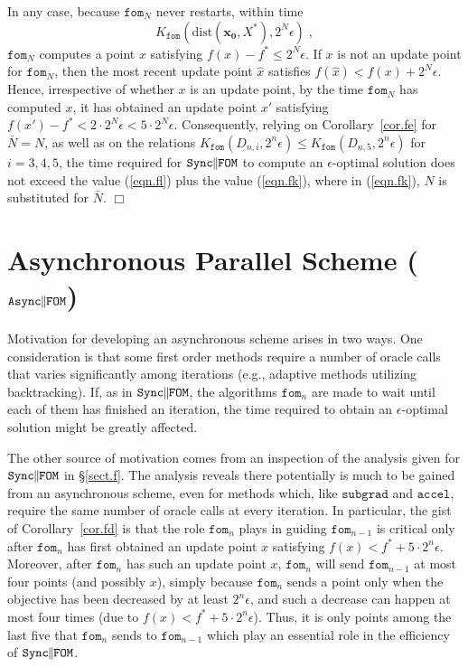 \documentclass[reqno, 11pt]{amsart}
\numberwithin{equation}{section}
\newcommand{\nt}{\negthinspace}
\newcommand{\fom}{\mathtt{fom}}
\newcommand{\parfom}{\parallel \nt \nt  \mathtt{FOM}}
\newcommand{\subgrad}{\mathtt{subgrad}}
\newcommand{\accel}{\mathtt{accel}}
\newcommand{\sparfom}{\mathtt{Sync} \nt \nt  \parfom}
\newcommand{\aparfom}{\mathtt{Async} \nt \nt \parfom}
\newcommand{\dist}{\mathrm{dist}}
\begin{document}
In any case, because $ \fom_{N} $ never restarts, within time 
\begin{equation}  \label{eqn.fl} 
        K_{\fom}( \dist( \mathbf{x_0}, X^*), 2^{N}\epsilon) \; , 
        \end{equation}
$ \fom_{N} $ computes a point $ x $ satisfying $ f(x) - f^* \leq 2^{N} \epsilon $. If $ x $ is not an update point for $ \fom_{N} $, then the most recent update point $ \hat{x} $ satisfies $ f(\hat{x}) < f(x) + 2^{N} \epsilon $. Hence, irrespective of whether $ x $ is an update point, by the time $ \fom_{N} $ has computed $ x $, it has obtained an update point $ x' $ satisfying $ f(x') - f^* < 2 \cdot 2^{N} \epsilon < 5 \cdot 2^{N} \epsilon $. Consequently, relying on Corollary~\ref{cor.fe} for $ \bar{N} = N $, as well as on the relations $ K_{\fom}(D_{n,i}, 2^n \epsilon ) \leq  K_{\fom}(D_{n,5}, 2^n \epsilon )  $ for $ i = 3,4,5 $, the time required for $ \sparfom $ to compute an $ \epsilon$-optimal solution does not exceed the value (\ref{eqn.fl})    plus the value (\ref{eqn.fk}), where in (\ref{eqn.fk}),  $ N $ is substituted for $ \bar{N} $. \hfill $ \Box $  



\section{{\bf  Asynchronous Parallel Scheme ($ \aparfom $)}} \label{sect.g} 

Motivation for developing an asynchronous scheme arises in two ways. One consideration is that some first order methods require a number of oracle calls that varies significantly among iterations (e.g., adaptive methods utilizing backtracking). If, as in $ \sparfom $, the algorithms $ \fom_n $ are made to wait until each of them has finished an iteration, the time required to obtain an $ \epsilon $-optimal solution might be greatly affected.

The other source of motivation comes from an inspection of the analysis given for $ \sparfom $ in \S\ref{sect.f}. The analysis reveals there potentially is much to be gained from an asynchronous scheme, even for methods which, like $ \subgrad $ and $ \accel $, require the same number of oracle calls at every iteration.  In particular, the gist of Corollary~\ref{cor.fd}  is that the role $ \fom_n $ plays in guiding $ \fom_{n-1} $ is critical only after $ \fom_n $ has first obtained an update point $ x $ satisfying $ f(x) < f^* + 5 \cdot 2^n \epsilon $. Moreover, after $ \fom_n $ has such an update point $ x $, $ \fom_n $ will send $ \fom_{n-1} $ at most four points (and possibly $ x $), simply because $ \fom_n $ sends a point only when the objective has been decreased by at least $ 2^n \epsilon $, and such a decrease can happen at most four times (due to $ f(x) < f^* + 5 \cdot 2^n \epsilon $). Thus, it is only points among the last five that $ \fom_n $ sends to $ \fom_{n-1} $ which play an essential role in the efficiency of $ \sparfom $. 
\end{document}
